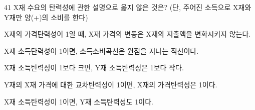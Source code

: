 \begin{question}{41}
X재 수요의 탄력성에 관한 설명으로 옳지 않은 것은? (단, 주어진 소득으로 X재와 Y재만 양(+)의 소비를 한다)
\begin{choices}
  \item X재의 가격탄력성이 1일 때, X재 가격의 변동은 X재의 지출액을 변화시키지 않는다.
  \item X재 소득탄력성이 1이면, 소득소비곡선은 원점을 지나는 직선이다.
  \item X재 소득탄력성이 1보다 크면, Y재 소득탄력성은 1보다 작다.
  \item Y재의 X재 가격에 대한 교차탄력성이 1이면, X재의 가격탄력성은 1이다.
  \item X재 소득탄력성이 1이면, Y재 소득탄력성도 1이다.
\end{choices}
\end{question}
